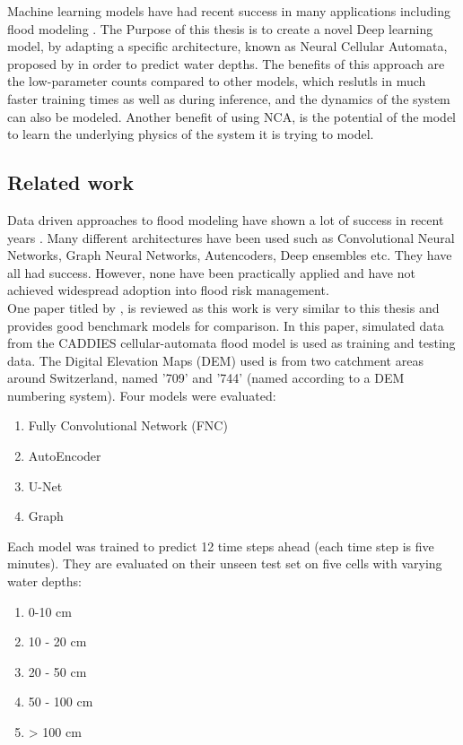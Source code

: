 Machine learning models have had recent success in many applications including flood modeling \cite{russo2023evaluation, karim2023review, chaudhary2022flood}. The Purpose of this thesis is to create a novel Deep learning model, by adapting a specific architecture, known as Neural Cellular Automata, proposed by \citeauthor{growing_nca} \cite{growing_nca} in order to predict water depths. The benefits of this approach are the low-parameter counts compared to other models, which reslutls in much faster training times as well as during inference, and the dynamics of the system can also be modeled. Another benefit of using NCA, is the potential of the model to learn the underlying physics of the system it is trying to model.

\subsection{Related work}
Data driven approaches to flood modeling have shown a lot of success in recent years \cite{russo2023evaluation, karim2023review, chaudhary2022flood}. Many different architectures have been used such as Convolutional Neural Networks, Graph Neural Networks, Autencoders, Deep ensembles etc. They have all had success. However, none have been practically applied and have not achieved widespread adoption into flood risk management. \\

One paper titled  by  \citeauthor{russo2023evaluation} \cite{russo2023evaluation}, is reviewed as this work is very similar to this thesis and provides good benchmark models for comparison. In this paper, simulated data from the CADDIES cellular-automata flood model is used as training and testing data. The Digital Elevation Maps (DEM) used is from two catchment areas around Switzerland, named '709' and '744' (named according to a DEM numbering system). Four models were evaluated:
\begin{enumerate}
	\item Fully Convolutional Network (FNC)
	\item AutoEncoder
	\item U-Net
	\item Graph
\end{enumerate}

Each model was trained to predict 12 time steps ahead (each time step is five minutes). They are evaluated on their unseen test set on five cells with varying water depths:
\begin{enumerate}
	\item 0-10 cm
	\item 10 - 20 cm
	\item 20 - 50 cm
	\item 50 - 100 cm
	\item > 100 cm
\end{enumerate} 

